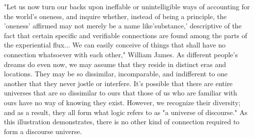 \documentclass[a4paper,12pt]{book}[2004/02/16]
\theoremstyle{ilemma}
\theoremstyle{itheorem}
\theoremstyle{iother}
\theoremstyle{icorollary}
\theoremstyle{numcorollary}
\theoremstyle{idefinition}
\begin{document}
"Let us now turn our backs upon ineffable or unintelligible ways of accounting for the world's oneness, and inquire whether, instead of being a principle, the 'oneness' affirmed may not merely be a name like'substance,' descriptive of the fact that certain specific and verifiable connections are found among the parts of the experiential flux... We can easily conceive of things that shall have no connection whatsoever with each other," William James. As different people's dreams do even now, we may assume that they reside in distinct eras and locations. They may be so dissimilar, incomparable, and indifferent to one another that they never jostle or interfere. It's possible that there are entire universes that are so dissimilar to ours that those of us who are familiar with ours have no way of knowing they exist. However, we recognize their diversity; and as a result, they all form what logic refers to as "a universe of discourse." As this illustration demonstrates, there is no other kind of connection required to form a discourse universe.
\end{document}
